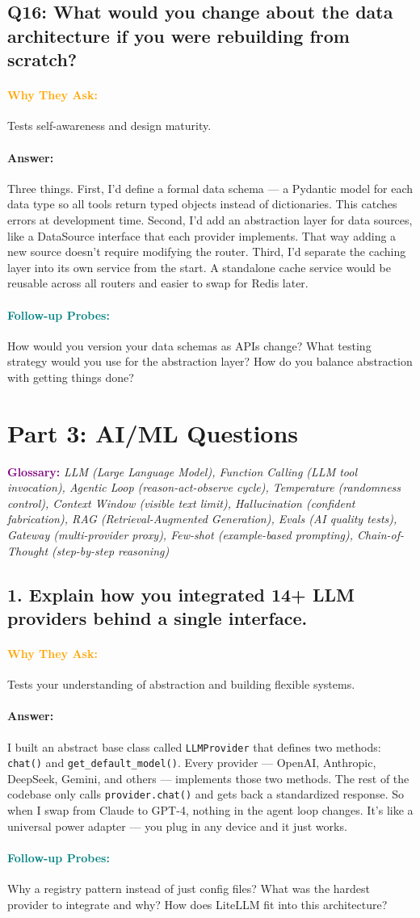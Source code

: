 \documentclass[11pt,a4paper]{article}
\newcommand{\Q}[1]{\subsection{#1}}
\newcommand{\Ans}[1]{\paragraph{\textbf{Answer:}} #1}
\newcommand{\Why}{\paragraph{\textcolor{orange}{\textbf{Why They Ask:}}}}
\newcommand{\Probe}{\paragraph{\textcolor{teal}{\textbf{Follow-up Probes:}}}}
\begin{document}
\Q{Q16: What would you change about the data architecture if you were rebuilding from scratch?}
\Why Tests self-awareness and design maturity.
\Ans Three things. First, I'd define a formal data schema --- a Pydantic model for each data type so all tools return typed objects instead of dictionaries. This catches errors at development time. Second, I'd add an abstraction layer for data sources, like a DataSource interface that each provider implements. That way adding a new source doesn't require modifying the router. Third, I'd separate the caching layer into its own service from the start. A standalone cache service would be reusable across all routers and easier to swap for Redis later.
\Probe How would you version your data schemas as APIs change? What testing strategy would you use for the abstraction layer? How do you balance abstraction with getting things done?

\newpage
\section{Part 3: AI/ML Questions}

\textcolor{purple}{\textbf{Glossary:}} \textit{LLM (Large Language Model), Function Calling (LLM tool invocation), Agentic Loop (reason-act-observe cycle), Temperature (randomness control), Context Window (visible text limit), Hallucination (confident fabrication), RAG (Retrieval-Augmented Generation), Evals (AI quality tests), Gateway (multi-provider proxy), Few-shot (example-based prompting), Chain-of-Thought (step-by-step reasoning)}

\Q{1. Explain how you integrated 14+ LLM providers behind a single interface.}
\Why Tests your understanding of abstraction and building flexible systems.
\Ans I built an abstract base class called \texttt{LLMProvider} that defines two methods: \texttt{chat()} and \texttt{get\_default\_model()}. Every provider --- OpenAI, Anthropic, DeepSeek, Gemini, and others --- implements those two methods. The rest of the codebase only calls \texttt{provider.chat()} and gets back a standardized response. So when I swap from Claude to GPT-4, nothing in the agent loop changes. It's like a universal power adapter --- you plug in any device and it just works.
\Probe Why a registry pattern instead of just config files? What was the hardest provider to integrate and why? How does LiteLLM fit into this architecture?
\end{document}
